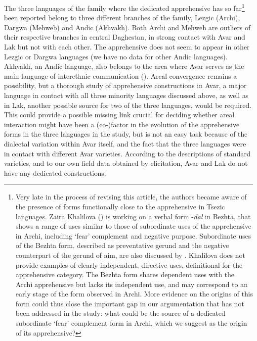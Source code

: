 \documentclass[output=paper,colorlinks,citecolor=brown]{langscibook}
\begin{document}
The three languages of the family where the dedicated apprehensive has so far\footnote{Very late in the process of revising this article, the authors became aware of the presence of forms functionally close to the apprehensive in Tsezic languages. Zaira Khalilova (\citealt{khalilova}) is working on a verbal form \nobreakdash-\textit{dal} in Bezhta, that shows a range of uses similar to those of subordinate uses of the apprehensive in Archi, including `fear' complement and negative purpose. Subordinate uses of the Bezhta form, described as preventative gerund and the negative counterpart of the gerund of aim, are also discussed by \citet[267]{KibrikTestelec2004}. Khalilova does not provide examples of clearly independent, directive uses, definitional for the apprehensive category. The Bezhta form  shares dependent uses with the Archi apprehensive but lacks its independent use, and may correspond to an early stage of the form observed in Archi. More evidence on the origins of this form could thus close the important gap in our argumentation that has not been addressed in the study: what could be the source of a dedicated subordinate `fear' complement form in Archi, which we suggest as the origin of its apprehensive?} been reported belong to three different branches of the family, Lezgic (Archi), Dargwa (Mehweb) and Andic (Akhvakh). Both Archi and Mehweb are outliers of their respective branches in central Daghestan, in strong contact with Avar and Lak but not with each other. The apprehensive does not seem to appear in other Lezgic or Dargwa languages (we have no data for other Andic languages). Akhvakh, an Andic language, also belongs to the area where Avar serves as the main language of interethnic communication (\citealt{DobrushinaZakirova2019}). Areal convergence remains a possibility, but a thorough study of apprehensive constructions in Avar, a major language in contact with all three minority languages discussed above, as well as in Lak, another possible source for two of the three languages, would be required. This could provide a possible missing link crucial for deciding whether areal interaction might have been a (co-)factor in the evolution of the apprehensive forms in the three languages in the study, but is not an easy task because of the dialectal variation within Avar itself, and the fact that the three languages were in contact with different Avar varieties. According to the descriptions of standard varieties, and to our own field data obtained by elicitation, Avar and Lak do not have any dedicated constructions. 
\end{document}
